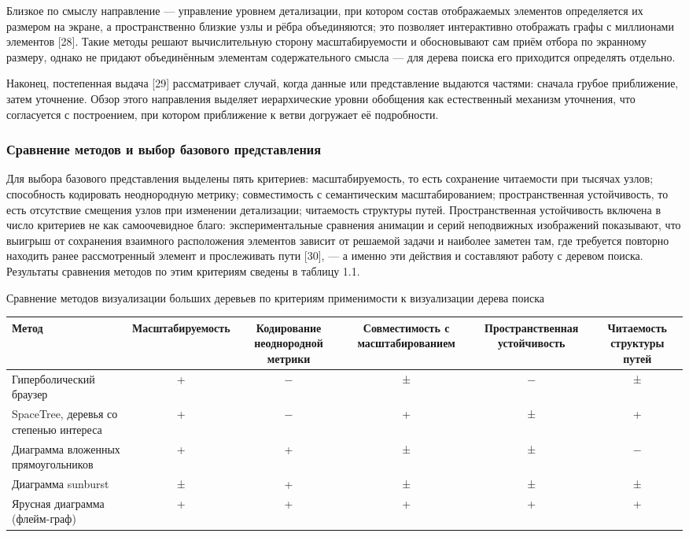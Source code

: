 Близкое по смыслу направление — управление уровнем детализации, при котором состав отображаемых элементов определяется их размером на экране, а пространственно близкие узлы и рёбра объединяются; это позволяет интерактивно отображать графы с миллионами элементов [28]. Такие методы решают вычислительную сторону масштабируемости и обосновывают сам приём отбора по экранному размеру, однако не придают объединённым элементам содержательного смысла — для дерева поиска его приходится определять отдельно.

Наконец, постепенная выдача [29] рассматривает случай, когда данные или представление выдаются частями: сначала грубое приближение, затем уточнение. Обзор этого направления выделяет иерархические уровни обобщения как естественный механизм уточнения, что согласуется с построением, при котором приближение к ветви догружает её подробности.

\subsubsection{Сравнение методов и выбор базового представления}

Для выбора базового представления выделены пять критериев: масштабируемость, то есть сохранение читаемости при тысячах узлов; способность кодировать неоднородную метрику; совместимость с семантическим масштабированием; пространственная устойчивость, то есть отсутствие смещения узлов при изменении детализации; читаемость структуры путей. Пространственная устойчивость включена в число критериев не как самоочевидное благо: экспериментальные сравнения анимации и серий неподвижных изображений показывают, что выигрыш от сохранения взаимного расположения элементов зависит от решаемой задачи и наиболее заметен там, где требуется повторно находить ранее рассмотренный элемент и прослеживать пути [30], — а именно эти действия и составляют работу с деревом поиска. Результаты сравнения методов по этим критериям сведены в таблицу 1.1.

\begin{gosttable}{}{Сравнение методов визуализации больших деревьев по критериям применимости к визуализации дерева поиска}

\begin{tabularx}{\linewidth}{>{\raggedright\arraybackslash}Xccccc}
\hline
Метод & Масштабируемость & Кодирование неоднородной метрики & Совместимость с масштабированием & Пространственная устойчивость & Читаемость структуры путей \\
\hline
Гиперболический браузер & + & − & ± & − & ± \\
\hline
SpaceTree, деревья со степенью интереса & + & − & + & ± & + \\
\hline
Диаграмма вложенных прямоугольников & + & + & ± & ± & − \\
\hline
Диаграмма sunburst & ± & + & ± & ± & ± \\
\hline
Ярусная диаграмма (флейм-граф) & + & + & + & + & + \\
\hline
\end{tabularx}

\end{gosttable}

